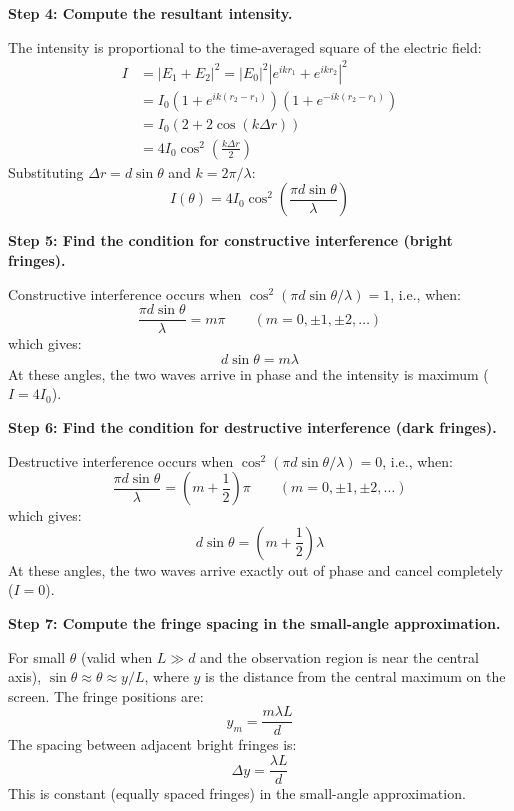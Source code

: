\textbf{Step 4: Compute the resultant intensity.}

The intensity is proportional to the time-averaged square of the electric field:
\begin{align}
I &= |E_1 + E_2|^2 = |E_0|^2|e^{ikr_1} + e^{ikr_2}|^2 \nonumber\\
&= I_0\left(1 + e^{ik(r_2-r_1)}\right)\left(1 + e^{-ik(r_2-r_1)}\right) \nonumber\\
&= I_0\left(2 + 2\cos(k\Delta r)\right) \nonumber\\
&= 4I_0\cos^2\!\left(\frac{k\Delta r}{2}\right)
\end{align}
Substituting $\Delta r = d\sin\theta$ and $k = 2\pi/\lambda$:
\begin{equation}
I(\theta) = 4I_0\cos^2\!\left(\frac{\pi d\sin\theta}{\lambda}\right)
\end{equation}

\textbf{Step 5: Find the condition for constructive interference (bright fringes).}

Constructive interference occurs when $\cos^2(\pi d\sin\theta/\lambda) = 1$, i.e., when:
\begin{equation}
\frac{\pi d\sin\theta}{\lambda} = m\pi \qquad (m = 0, \pm 1, \pm 2, \ldots)
\end{equation}
which gives:
\begin{equation}
d\sin\theta = m\lambda
\end{equation}
At these angles, the two waves arrive in phase and the intensity is maximum ($I = 4I_0$).

\textbf{Step 6: Find the condition for destructive interference (dark fringes).}

Destructive interference occurs when $\cos^2(\pi d\sin\theta/\lambda) = 0$, i.e., when:
\begin{equation}
\frac{\pi d\sin\theta}{\lambda} = \left(m + \frac{1}{2}\right)\pi \qquad (m = 0, \pm 1, \pm 2, \ldots)
\end{equation}
which gives:
\begin{equation}
d\sin\theta = \left(m + \frac{1}{2}\right)\lambda
\end{equation}
At these angles, the two waves arrive exactly out of phase and cancel completely ($I = 0$).

\textbf{Step 7: Compute the fringe spacing in the small-angle approximation.}

For small $\theta$ (valid when $L \gg d$ and the observation region is near the central axis), $\sin\theta \approx \theta \approx y/L$, where $y$ is the distance from the central maximum on the screen. The fringe positions are:
\begin{equation}
y_m = \frac{m\lambda L}{d}
\end{equation}
The spacing between adjacent bright fringes is:
\begin{equation}
\Delta y = \frac{\lambda L}{d}
\end{equation}
This is constant (equally spaced fringes) in the small-angle approximation.

